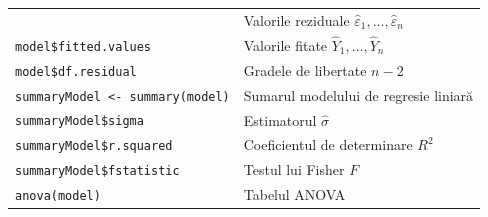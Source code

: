\documentclass[]{article}
\begin{document}
\begin{longtable}[]{@{}ll@{}}
\begin{minipage}[t]{0.49\columnwidth}
\end{minipage} & \begin{minipage}[t]{0.45\columnwidth}\raggedright\strut
Valorile reziduale \(\hat\varepsilon_1,\ldots,\hat\varepsilon_n\)\strut
\end{minipage}\tabularnewline
\begin{minipage}[t]{0.49\columnwidth}\raggedright\strut
\texttt{model\$fitted.values}\strut
\end{minipage} & \begin{minipage}[t]{0.45\columnwidth}\raggedright\strut
Valorile fitate \(\hat Y_1,\ldots,\hat Y_n\)\strut
\end{minipage}\tabularnewline
\begin{minipage}[t]{0.49\columnwidth}\raggedright\strut
\texttt{model\$df.residual}\strut
\end{minipage} & \begin{minipage}[t]{0.45\columnwidth}\raggedright\strut
Gradele de libertate \(n-2\)\strut
\end{minipage}\tabularnewline
\begin{minipage}[t]{0.49\columnwidth}\raggedright\strut
\texttt{summaryModel\ \textless{}-\ summary(model)}\strut
\end{minipage} & \begin{minipage}[t]{0.45\columnwidth}\raggedright\strut
Sumarul modelului de regresie liniară\strut
\end{minipage}\tabularnewline
\begin{minipage}[t]{0.49\columnwidth}\raggedright\strut
\texttt{summaryModel\$sigma}\strut
\end{minipage} & \begin{minipage}[t]{0.45\columnwidth}\raggedright\strut
Estimatorul \(\hat\sigma\)\strut
\end{minipage}\tabularnewline
\begin{minipage}[t]{0.49\columnwidth}\raggedright\strut
\texttt{summaryModel\$r.squared}\strut
\end{minipage} & \begin{minipage}[t]{0.45\columnwidth}\raggedright\strut
Coeficientul de determinare \(R^2\)\strut
\end{minipage}\tabularnewline
\begin{minipage}[t]{0.49\columnwidth}\raggedright\strut
\texttt{summaryModel\$fstatistic}\strut
\end{minipage} & \begin{minipage}[t]{0.45\columnwidth}\raggedright\strut
Testul lui Fisher \(F\)\strut
\end{minipage}\tabularnewline
\begin{minipage}[t]{0.49\columnwidth}\raggedright\strut
\texttt{anova(model)}\strut
\end{minipage} & \begin{minipage}[t]{0.45\columnwidth}\raggedright\strut
Tabelul ANOVA\strut
\end{minipage}\tabularnewline
\bottomrule
\end{longtable}
\end{document}
